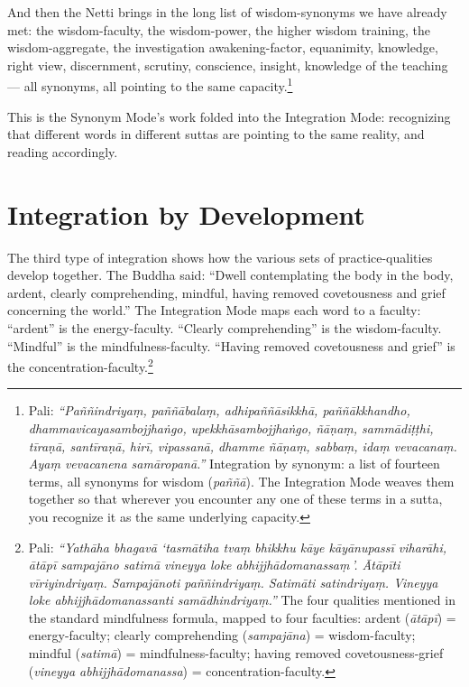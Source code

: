 And then the Netti brings in the long list of wisdom-synonyms we have already met: the wisdom-faculty, the wisdom-power, the higher wisdom training, the wisdom-aggregate, the investigation awakening-factor, equanimity, knowledge, right view, discernment, scrutiny, conscience, insight, knowledge of the teaching --- all synonyms, all pointing to the same capacity.\footnote{Pali: \textit{``Paññindriyaṃ, paññābalaṃ, adhipaññāsikkhā, paññākkhandho, dhammavicayasambojjhaṅgo, upekkhāsambojjhaṅgo, ñāṇaṃ, sammādiṭṭhi, tīraṇā, santīraṇā, hirī, vipassanā, dhamme ñāṇaṃ, sabbaṃ, idaṃ vevacanaṃ. Ayaṃ vevacanena samāropanā.''} Integration by synonym: a list of fourteen terms, all synonyms for wisdom (\textit{paññā}). The Integration Mode weaves them together so that wherever you encounter any one of these terms in a sutta, you recognize it as the same underlying capacity.}

This is the Synonym Mode's work folded into the Integration Mode: recognizing that different words in different suttas are pointing to the same reality, and reading accordingly.

\section*{Integration by Development}

The third type of integration shows how the various sets of practice-qualities develop together. The Buddha said: ``Dwell contemplating the body in the body, ardent, clearly comprehending, mindful, having removed covetousness and grief concerning the world.'' The Integration Mode maps each word to a faculty: ``ardent'' is the energy-faculty. ``Clearly comprehending'' is the wisdom-faculty. ``Mindful'' is the mindfulness-faculty. ``Having removed covetousness and grief'' is the concentration-faculty.\footnote{Pali: \textit{``Yathāha bhagavā `tasmātiha tvaṃ bhikkhu kāye kāyānupassī viharāhi, ātāpī sampajāno satimā vineyya loke abhijjhādomanassaṃ\,'. Ātāpīti vīriyindriyaṃ. Sampajānoti paññindriyaṃ. Satimāti satindriyaṃ. Vineyya loke abhijjhādomanassanti samādhindriyaṃ.''} The four qualities mentioned in the standard mindfulness formula, mapped to four faculties: ardent (\textit{ātāpī}) = energy-faculty; clearly comprehending (\textit{sampajāna}) = wisdom-faculty; mindful (\textit{satimā}) = mindfulness-faculty; having removed covetousness-grief (\textit{vineyya abhijjhādomanassa}) = concentration-faculty.}

